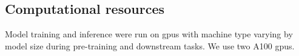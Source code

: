\documentclass[pdflatex, sn-mathphys-num, lineno]{sn-jnl}%
\theoremstyle{thmstyleone}%
\theoremstyle{thmstyletwo}%
\theoremstyle{thmstylethree}%
\begin{document}
\begin{appendices}
	\section{Computational resources}

	Model training and inference were run on \glspl{gpu}   with machine type varying by model size during pre-training and downstream tasks.
	We use two  A100 \glspl{gpu}.
\end{appendices}


\end{document}
